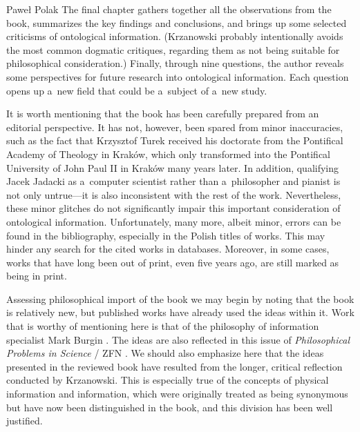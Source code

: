 \begin{newrevengenv}{Paweł Polak}
The final chapter gathers together all the observations from the book, summarizes the key findings and conclusions, and brings up some selected criticisms of ontological information. (Krzanowski probably intentionally avoids the most common dogmatic critiques, regarding them as not being suitable for philosophical consideration.) Finally, through nine questions, the author reveals some perspectives for future research into ontological information. Each question opens up a~new field that could be a~subject of a~new study.

It is worth mentioning that the book has been carefully prepared from an editorial perspective. It has not, however, been spared from minor inaccuracies, such as the fact that Krzysztof Turek received his doctorate from the Pontifical Academy of Theology in Kraków, which only transformed into the Pontifical University of John Paul II in Kraków many years later. In addition, qualifying Jacek Jadacki as a~computer scientist
\parencite[][p.45]{krzanowski_ontological_2022} %
 rather than a~philosopher and pianist is not only untrue—it is also inconsistent with the rest of the work. Nevertheless, these minor glitches do not significantly impair this important consideration of ontological information. Unfortunately, many more, albeit minor, errors can be found in the bibliography, especially in the Polish titles of works. This may hinder any search for the cited works in databases. Moreover, in some cases, works that have long been out of print, even five years ago, are still marked as being in print.

Assessing philosophical import of the book we may begin by noting that the book is relatively new, but published works have already used the ideas within it. Work that is worthy of mentioning here is that of the philosophy of information specialist Mark Burgin
\parencite[][]{burgin_is_2022}. %
 The ideas are also reflected in this issue of \textit{Philosophical Problems in Science} / ZFN 
\parencite[][]{mscislawski_is_2022}. %
 We should also emphasize here that the ideas presented in the reviewed book have resulted from the longer, critical reflection conducted by Krzanowski. This is especially true of the concepts of physical information and information, which were originally treated as being synonymous but have now been distinguished in the book, and this division has been well justified.


\end{newrevengenv}
